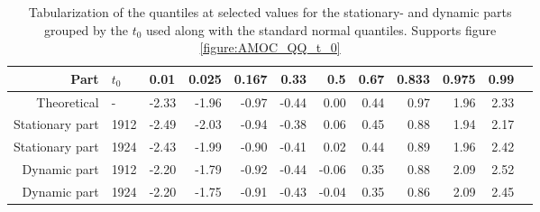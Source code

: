     \begin{table}[h!]
        \centering
        \begin{tabular}{rllrrrrrrrrr}
          \hline
         Part & $t_0$ & 0.01 & 0.025 & 0.167 & 0.33 & 0.5 & 0.67 & 0.833 & 0.975 & 0.99 \\ 
          \hline
        Theoretical & - & -2.33 & -1.96 & -0.97 & -0.44 & 0.00 & 0.44 & 0.97 & 1.96 & 2.33 \\ 
        Stationary part & 1912 & -2.49 & -2.03 & -0.94 & -0.38 & 0.06 & 0.45 & 0.88 & 1.94 & 2.17 \\ 
        Stationary part & 1924 & -2.43 & -1.99 & -0.90 & -0.41 & 0.02 & 0.44 & 0.89 & 1.96 & 2.42 \\ 
        Dynamic part & 1912 & -2.20 & -1.79 & -0.92 & -0.44 & -0.06 & 0.35 & 0.88 & 2.09 & 2.52 \\ 
        Dynamic part & 1924 & -2.20 & -1.75 & -0.91 & -0.43 & -0.04 & 0.35 & 0.86 & 2.09 & 2.45 \\ 
           \hline
        \end{tabular}
        \caption{Tabularization of the quantiles at selected values for the stationary- and dynamic parts grouped by the $t_0$ used along with the standard normal quantiles. Supports figure \ref{figure:AMOC_QQ_t_0}}
        \label{table:QQ_table_parts}
        \end{table}